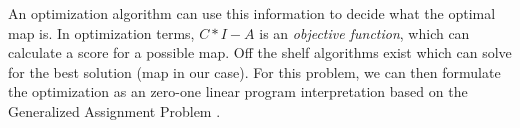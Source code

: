 

An optimization algorithm can use this information to decide what the optimal map is. In optimization terms, $C*I-A$ is an \textit{objective function}, which can calculate a score for a possible map. Off the shelf algorithms exist which can solve for the best solution (map in our case). For this problem, we can then  formulate the optimization as an zero-one linear program interpretation based on the Generalized Assignment Problem
\cite{unknown_GAP}. 

